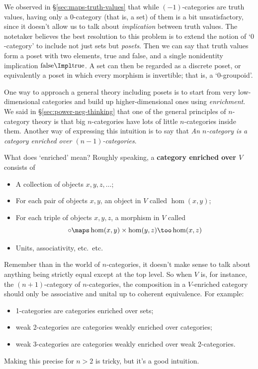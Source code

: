 \documentclass{amsart}
\begin{document}
We observed in \S\ref{sec:maps-truth-values} that while
$(-1)$-categories are truth values, having only a $0$-category (that
is, a set) of them is a bit unsatisfactory, since it doesn't allow us
to talk about \emph{implication} between truth values.  The notetaker
believes the best resolution to this problem is to extend the notion
of `$0$-category' to include not just sets but \emph{posets}.  Then we
can say that truth values form a poset with two elements, true and
false, and a single nonidentity implication
$\mathrm{false}\Impl\mathrm{true}$.  A set can then be regarded as a
discrete poset, or equivalently a poset in which every morphism is
invertible; that is, a `$0$-groupoid'.

One way to approach a general theory including posets is to start from
very low-dimensional categories and build up higher-dimensional ones
using \emph{enrichment}.  We said in \S\ref{sec:power-neg-thinking}
that one of the general principles of $n$-category theory is that big
$n$-categories have lots of little $n$-categories inside them.
Another way of expressing this intuition is to say that \emph{An
  $n$-category is a category enriched over $(n-1)$-categories}.

What does `enriched' mean?  Roughly speaking, a \textbf{category
  enriched over $V$} consists of
\begin{itemize}
\item A collection of objects $x,y,z,\dots$;
\item For each pair of objects $x,y$, an object in $V$ called $\hom(x,y)$;
\item For each triple of objects $x,y,z$, a morphism in $V$ called
  \[\circ \maps \hom(x,y)\times \hom(y,z)\too\hom(x,z)\]
\item Units, associativity, etc.\ etc.\
\end{itemize}
Remember than in the world of $n$-categories, it doesn't make sense to
talk about anything being strictly equal except at the top level.  So
when $V$ is, for instance, the $(n+1)$-category of $n$-categories, the
composition in a $V$-enriched category should only be associative and
unital up to coherent equivalence.  For example:
\begin{itemize}
\item 1-categories are categories enriched over sets;
\item weak 2-categories are categories weakly enriched over
  categories;
\item weak 3-categories are categories weakly enriched over
  weak 2-categories.
\end{itemize}
Making this precise for $n>2$ is tricky, but it's a good intuition.
\end{document}
